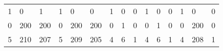 \begin{table}
{\begin{tabular}{lllllllllllllll}
    1      & 0        & 1        & 1       & 0        & 0        & 1        & 0       & 0       & 1       & 0       & 0       & 1       & 0        & 0      \\
    0      & 200      & 200      & 0       & 200      & 200      & 0        & 1       & 0       & 0       & 1       & 0       & 0       & 200      & 0      \\
    \hline
    5      & 210      & 207      & 5       & 209      & 205      & 4        & 6       & 1       & 4       & 6       & 1       & 4       & 208      & 1
    \end{tabular}}
\end{table}